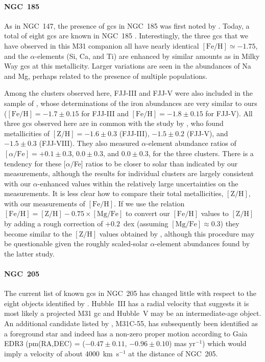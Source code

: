 \documentclass{aa}
\begin{document}
\paragraph{NGC~185}

As in NGC~147, the presence of \acp{gc} in NGC~185 was first noted by \citet{Baade1944a}. Today, a total of eight \acp{gc} are known in NGC~185 \citep{Veljanoski2013}. 
Interestingly, the three \acp{gc} that we have observed in this M31 companion all have nearly identical $\mathrm{[Fe/H]}\simeq-1.75$, and the $\alpha$-elements (Si, Ca, and Ti) are enhanced by similar amounts as in Milky Way \acp{gc} at this metallicity. Larger variations are seen in the abundances of Na and Mg, perhaps related to the presence of multiple populations.

Among the clusters observed here, FJJ-III and FJJ-V were also included in the sample of \citet{DaCosta1988}, whose determinations of the iron abundances are very similar to ours
($\mathrm{[Fe/H]}=-1.7\pm0.15$ for FJJ-III and $\mathrm{[Fe/H]}=-1.8\pm0.15$ for FJJ-V). 
All three \acp{gc} observed here are in common with the study by \citet{Sharina2006}, who found metallicities of
$\mathrm{[Z/H]} = -1.6\pm0.3$ (FJJ-III), $-1.5\pm0.2$ (FJJ-V), and $-1.5\pm0.3$ (FJJ-VIII).
They also measured $\alpha$-element abundance ratios of $[\alpha/\mathrm{Fe}] = +0.1\pm0.3$, $0.0\pm0.3$, and $0.0\pm0.3$, for the three clusters. 
There is a tendency for these [$\alpha/$Fe] ratios to be closer to solar than indicated by our measurements, although the results for individual clusters are largely consistent with our $\alpha$-enhanced values within the relatively large uncertainties on the \citet{Sharina2006} measurements. 
It is less clear how to compare their total metallicities, $\mathrm{[Z/H]}$, with our measurements of $\mathrm{[Fe/H]}$. If we use the relation $\mathrm{[Fe/H]} = \mathrm{[Z/H]} - 0.75 \times \mathrm{[Mg/Fe]}$ \citep{Vazdekis2015} to
convert our $\mathrm{[Fe/H]}$ values to $\mathrm{[Z/H]}$ by adding a rough correction of $+0.2$~dex (assuming $\mathrm{[Mg/Fe]}\approx0.3$) they become similar to the $\mathrm{[Z/H]}$ values obtained by \citet{Sharina2006}, although this procedure may be questionable given the roughly scaled-solar $\alpha$-element abundances found by the latter study. 


\paragraph{NGC~205}

The current list of known \acp{gc} in NGC~205 has changed little with respect to the eight objects identified by \citet{Hubble1932}. Hubble~III has a radial velocity that suggests it is most likely a projected M31 \ac{gc} and Hubble~V may be an intermediate-age object. An additional candidate listed by \citet{Sargent1977}, M31C-55, has subsequently been identified as a foreground star \citep{Battistini1987,DaCosta1988,Galleti2004} and indeed has a non-zero proper motion according to Gaia EDR3 (pm(RA,DEC) = ($-0.47\pm0.11$, $-0.96\pm0.10$) mas yr$^{-1}$) which would imply a velocity of about 4000~km~s$^{-1}$ at the distance of NGC~205.
\end{document}
